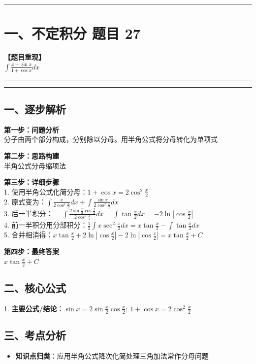 ﻿\documentclass[12pt, a4paper]{ctexart}
\newcommand{\TopSeparator}{
    \par\noindent\rule{\textwidth}{1.5pt}\vspace{0.5em}
}
\newcommand{\AnalysisSeparator}{
    \par\noindent\rule{\textwidth}{0.5pt}\vspace{0.2em}\hrule\vspace{0.5em}
}
\newenvironment{RedAnalysis}{
    \par
    \color{red} 
}{
    \par
    \color{black} 
}
\begin{document}
\vspace{2em}

\TopSeparator
\section*{一、不定积分 题目 27}

\textbf{【题目重现】} \\
$\int \frac{x+\sin x}{1+\cos x} dx$

\AnalysisSeparator

\begin{RedAnalysis}

	\subsection*{一、逐步解析}

	\textbf{第一步：问题分析} \\
	分子由两个部分构成，分别除以分母。用半角公式将分母转化为单项式

	\textbf{第二步：思路构建} \\
	半角公式分母缩项法

	\textbf{第三步：详细步骤} \\
	1. 使用半角公式化简分母：$1+\cos x = 2\cos^2\frac{x}{2}$ \\ 
	2. 原式变为：$\int \frac{x}{2\cos^2\frac{x}{2}} dx + \int \frac{\sin x}{2\cos^2\frac{x}{2}} dx$ \\ 
	3. 后一半积分：$= \int \frac{2\sin\frac{x}{2}\cos\frac{x}{2}}{2\cos^2\frac{x}{2}} dx = \int \tan\frac{x}{2} dx = -2\ln|\cos\frac{x}{2}|$ \\ 
	4. 前一半积分用分部积分：$\frac{1}{2}\int x \sec^2\frac{x}{2} dx = x\tan\frac{x}{2} - \int \tan\frac{x}{2} dx$ \\ 
	5. 合并相消得：$x\tan\frac{x}{2} + 2\ln|\cos\frac{x}{2}| - 2\ln|\cos\frac{x}{2}| = x\tan\frac{x}{2} + C$

	\textbf{第四步：最终答案} \\
	$x\tan\frac{x}{2} + C$

	\subsection*{二、核心公式}
	1. \textbf{主要公式/结论}：$\sin x=2\sin\frac{x}{2}\cos\frac{x}{2}; \ 1+\cos x=2\cos^2\frac{x}{2}$

	\subsection*{三、考点分析}
	\begin{itemize}
		\item \textbf{知识点归类}：应用半角公式降次化简处理三角加法常作分母问题
	\end{itemize}

\end{RedAnalysis}
\end{document}
